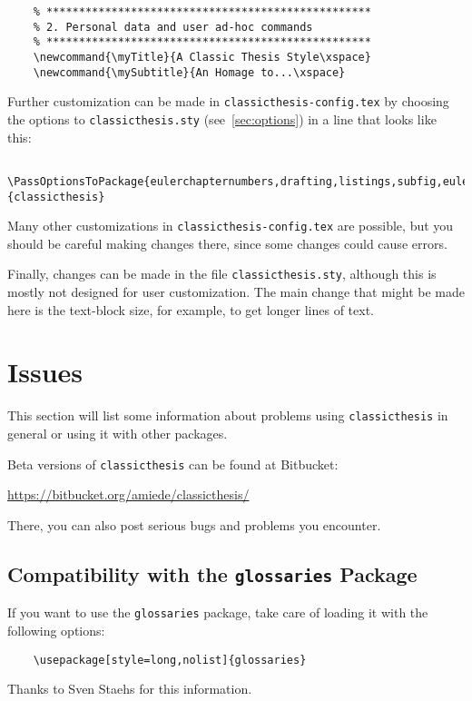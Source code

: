 \begin{lstlisting}
    % **************************************************
    % 2. Personal data and user ad-hoc commands
    % **************************************************
    \newcommand{\myTitle}{A Classic Thesis Style\xspace} 
    \newcommand{\mySubtitle}{An Homage to...\xspace} 
\end{lstlisting}

Further customization can be made in \texttt{classicthesis-config.tex}
by choosing the options to \texttt{classicthesis.sty} 
(see~\autoref{sec:options}) in a line that looks like this:

\begin{lstlisting}
    \PassOptionsToPackage{eulerchapternumbers,drafting,listings,subfig,eulermath,parts}{classicthesis}
\end{lstlisting}

Many other customizations in \texttt{classicthesis-config.tex} are
possible, but you should be careful making changes there, since some
changes could cause errors.

Finally, changes can be made in the file \texttt{classicthesis.sty},%
 although this is mostly not designed for user customization. The
main change that might be made here is the text-block size, for example,
to get longer lines of text.


\section{Issues}\label{sec:issues}
This section will list some information about problems using
\texttt{classic\-thesis} in general or using it with other packages.

Beta versions of \texttt{classicthesis} can be found at Bitbucket:
\begin{center}
    \url{https://bitbucket.org/amiede/classicthesis/}
\end{center}
There, you can also post serious bugs and problems you encounter.

\subsection*{Compatibility with the \texttt{glossaries} Package}
If you want to use the \texttt{glossaries} package, take care of loading it 
with the following options:
\begin{lstlisting}
    \usepackage[style=long,nolist]{glossaries}
\end{lstlisting}
Thanks to Sven Staehs for this information. 


